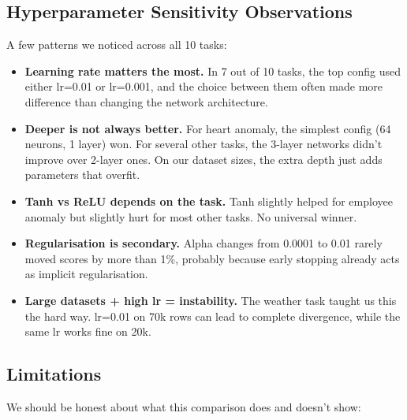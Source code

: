 \documentclass[11pt,a4paper]{article}
\begin{document}
\subsection{Hyperparameter Sensitivity Observations}

A few patterns we noticed across all 10 tasks:

\begin{itemize}[leftmargin=1.2em,itemsep=0.15em]
    \item \textbf{Learning rate matters the most.} In 7 out of 10 tasks, the top config used either lr=0.01 or lr=0.001, and the choice between them often made more difference than changing the network architecture.
    \item \textbf{Deeper is not always better.} For heart anomaly, the simplest config (64 neurons, 1 layer) won. For several other tasks, the 3-layer networks didn't improve over 2-layer ones. On our dataset sizes, the extra depth just adds parameters that overfit.
    \item \textbf{Tanh vs ReLU depends on the task.} Tanh slightly helped for employee anomaly but slightly hurt for most other tasks. No universal winner.
    \item \textbf{Regularisation is secondary.} Alpha changes from 0.0001 to 0.01 rarely moved scores by more than 1\%, probably because early stopping already acts as implicit regularisation.
    \item \textbf{Large datasets + high lr = instability.} The weather task taught us this the hard way. lr=0.01 on 70k rows can lead to complete divergence, while the same lr works fine on 20k.
\end{itemize}

\subsection{Limitations}

We should be honest about what this comparison does and doesn't show:
\end{document}
